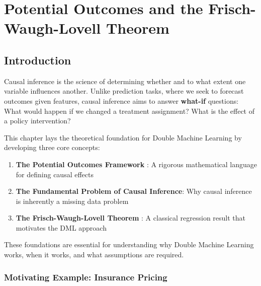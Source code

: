 
\chapter{Potential Outcomes and the Frisch-Waugh-Lovell Theorem}
\label{ch:potential_outcomes_fwl}

\section{Introduction}\label{sec:ch01_introduction}

Causal inference is the science of determining whether and to what
extent one variable influences another. Unlike prediction tasks, where
we seek to forecast outcomes given features, causal inference aims to
answer \textbf{what-if} questions: What would happen if we changed a
treatment assignment? What is the effect of a policy intervention?

This chapter lays the theoretical foundation for Double Machine Learning
by developing three core concepts:

\begin{enumerate}
\def\labelenumi{\arabic{enumi}.}
\item
  \textbf{The Potential Outcomes Framework}
  \cite{rubin1974estimating,holland1986statistics}: A rigorous
  mathematical language for defining causal effects
\item
  \textbf{The Fundamental Problem of Causal Inference}: Why causal
  inference is inherently a missing data problem
\item
  \textbf{The Frisch-Waugh-Lovell Theorem}
  \cite{frisch1933partial,lovell1963seasonal}: A classical
  regression result that motivates the DML approach
\end{enumerate}

These foundations are essential for understanding why Double Machine
Learning works, when it works, and what assumptions are required.

\subsection{Motivating Example: Insurance
Pricing}\label{_motivating_example_insurance_pricing}

